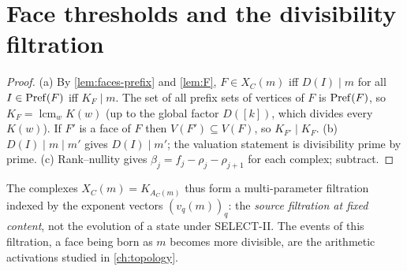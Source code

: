 \section{Face thresholds and the divisibility filtration}
\begin{proof}
(a) By \cref{lem:faces-prefix} and \cref{lem:F}, $F\in X_C(m)$ iff $D(I)\mid m$ for all $I\in\mathrm{Pref}(F)$ iff $K_F\mid m$. The set of all prefix sets of vertices of $F$ is $\mathrm{Pref}(F)$, so $K_F=\operatorname{lcm}_wK(w)$ (up to the global factor $D([k])$, which divides every $K(w)$). If $F'$ is a face of $F$ then $V(F')\subseteq V(F)$, so $K_{F'}\mid K_F$. (b) $D(I)\mid m\mid m'$ gives $D(I)\mid m'$; the valuation statement is divisibility prime by prime. (c) Rank--nullity gives $\beta_j=f_j-\rho_j-\rho_{j+1}$ for each complex; subtract.
\end{proof}
The complexes $X_C(m)=K_{A_C(m)}$ thus form a multi-parameter filtration indexed by the exponent vectors $(v_q(m))_q$: the \emph{source filtration at fixed content}, not the evolution of a state under SELECT-II. The events of this filtration, a face being born as $m$ becomes more divisible, are the arithmetic activations studied in \cref{ch:topology}.

